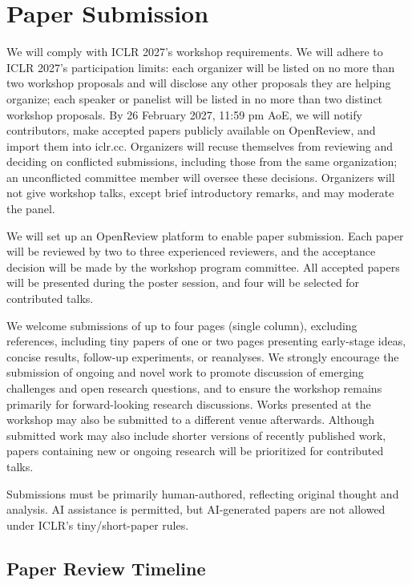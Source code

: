 \documentclass[11pt]{article}
\begin{document}
\section{Paper Submission}

We will comply with ICLR 2027's workshop requirements. We will adhere to ICLR 2027's participation limits: each organizer will be listed on no more than two workshop proposals and will disclose any other proposals they are helping organize; each speaker or panelist will be listed in no more than two distinct workshop proposals. By 26 February 2027, 11:59 pm AoE, we will notify contributors, make accepted papers publicly available on OpenReview, and import them into iclr.cc. Organizers will recuse themselves from reviewing and deciding on conflicted submissions, including those from the same organization; an unconflicted committee member will oversee these decisions. Organizers will not give workshop talks, except brief introductory remarks, and may moderate the panel.


We will set up an OpenReview platform to enable paper submission. Each paper will be reviewed by two to three experienced reviewers, and the acceptance decision will be made by the workshop program committee. All accepted papers will be presented during the poster session, and four will be selected for contributed talks.


We welcome submissions of up to four pages (single column), excluding references, including tiny papers of one or two pages presenting early-stage ideas, concise results, follow-up experiments, or reanalyses. We strongly encourage the submission of ongoing and novel work to promote discussion of emerging challenges and open research questions, and to ensure the workshop remains primarily for forward-looking research discussions. Works presented at the workshop may also be submitted to a different venue afterwards. Although submitted work may also include shorter versions of recently published work, papers containing new or ongoing research will be prioritized for contributed talks.


Submissions must be primarily human-authored, reflecting original thought and analysis. AI assistance is permitted, but AI-generated papers are not allowed under ICLR's tiny/short-paper rules.


\subsection{Paper Review Timeline}
\end{document}
